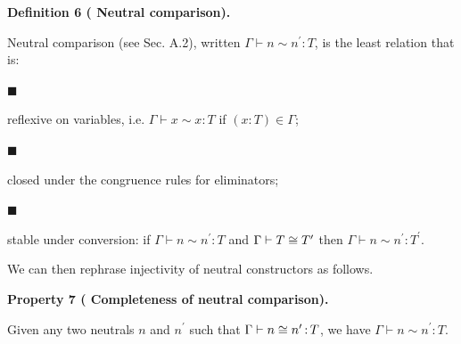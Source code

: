 \documentclass[10pt,a4paper]{amsart}
\begin{document}
 
 
\par\medskip\noindent\textbf{Definition 6 (  Neutral comparison).}\par
 
 
Neutral comparison (see Sec. A.2), written $\Gamma\vdash n\sim n^{\prime}\operatorname{\mathrel{:}}T$, is the least relation that is:\par
  
\par\noindent  $\blacksquare$ 
 
reflexive on variables, i.e. $\Gamma\vdash x\sim x\operatorname{\mathrel{:}}T$ if $(x:T)\in\Gamma$;\par
 
 
 
\par\noindent  $\blacksquare$ 
 
closed under the congruence rules for eliminators;\par
 
 
 
\par\noindent  $\blacksquare$ 
 
stable under conversion: if $\Gamma\vdash n\sim n^{\prime}\operatorname{\mathrel{:}}T$ and $\Gamma\vdash T\mathrel{\raisebox{-0.5pt}{$\cong$}}T^{\prime}$ then $\Gamma\vdash n\sim n^{\prime}\operatorname{\mathrel{:}}T^{\prime}$.\par
 
 
  
 
 
 
We can then rephrase injectivity of neutral constructors as follows.\par
 
 
 
\par\medskip\noindent\textbf{Property 7 (  Completeness of neutral comparison).}\par
 
 
Given any two neutrals $n$ and $n^{\prime}$ such that $\Gamma\vdash n\mathrel{\raisebox{-0.5pt}{$\cong$}}n^{\prime}\operatorname{%
\mathrel{:}}T$, we have $\Gamma\vdash n\sim n^{\prime}\operatorname{\mathrel{:}}T$.\par
 
\end{document}
